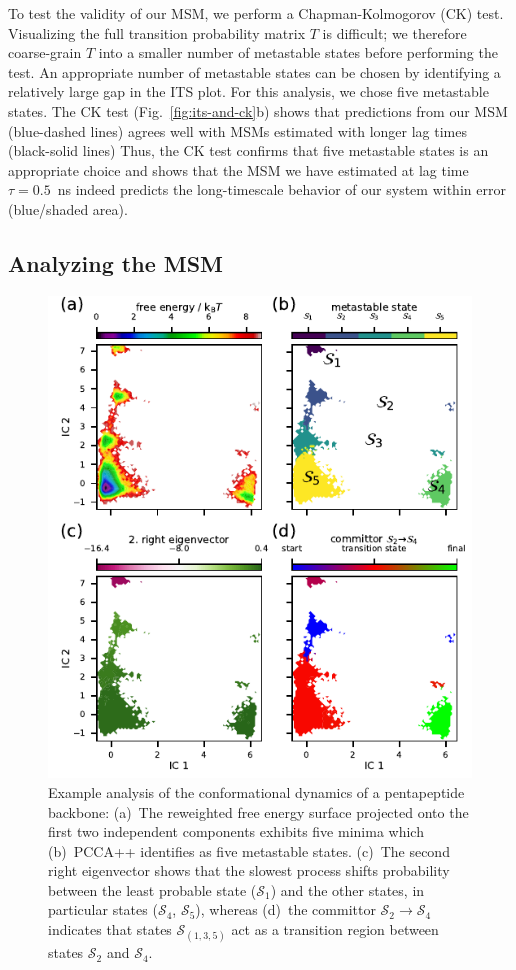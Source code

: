 \documentclass[9pt,tutorial]{livecoms}
\begin{document}
To test the validity of our MSM, we perform a Chapman-Kolmogorov (CK) test.
Visualizing the full transition probability matrix $T$ is difficult;
we therefore coarse-grain $T$ into a smaller number of metastable states before performing the test.
An appropriate number of metastable states can be chosen by identifying a relatively large gap in the ITS plot.
For this analysis, we chose five metastable states.
The CK test (Fig.~\ref{fig:its-and-ck}b) shows that predictions from our MSM (blue-dashed lines)
agrees well with MSMs estimated with longer lag times (black-solid lines)
Thus, the CK test confirms that five metastable states is an appropriate choice
and shows that the MSM we have estimated at lag time $\tau=0.5$~ns indeed predicts the
long-timescale behavior of our system within error (blue/shaded area).

\subsection{Analyzing the MSM}

\begin{figure}
\includegraphics{figure_5}
\caption{Example analysis of the conformational dynamics of a pentapeptide backbone:
(a)~The reweighted free energy surface projected onto the first two independent components exhibits five minima which
(b)~PCCA++ identifies as five metastable states.
(c)~The second right eigenvector shows that the slowest process shifts probability between the least probable state ($\mathcal{S}_1$) and the other states,
in particular states ($\mathcal{S}_4$, $\mathcal{S}_5$), whereas
(d)~the committor $\mathcal{S}_2\to\mathcal{S}_4$ indicates that states $\mathcal{S}_{(1,3,5)}$ act as a transition region between states $\mathcal{S}_2$ and $\mathcal{S}_4$.}
\label{fig:msm-analysis}
\end{figure}
\end{document}
